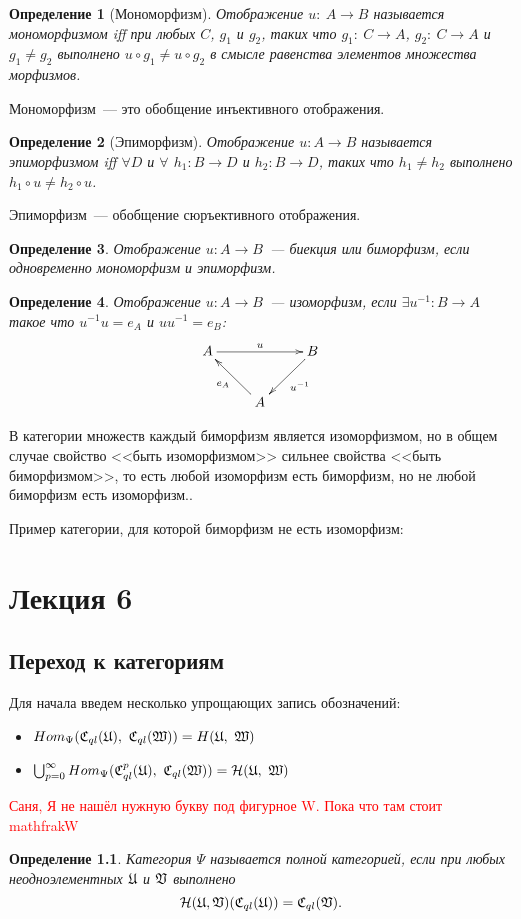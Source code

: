 \documentclass[a4paper, 12pt]{report}
\newtheorem{definition}{Определение}[chapter]
\begin{document}
\begin{definition}[Мономорфизм]
Отображение $u:\ A \rightarrow B$ называется мономорфизмом iff при любых $C$, $g_1$ и $g_2$, таких что $g_1:\ C \rightarrow A$, $g_2:\ C \rightarrow A$ и $g_1 \neq g_2$ выполнено $u \circ g_1 \neq u \circ g_2$ в смысле равенства элементов множества морфизмов.
\end{definition}

Мономорфизм~--- это обобщение инъективного отображения.
\begin{definition}[Эпиморфизм]
Отображение $u: A \rightarrow B$ называется эпиморфизмом iff $\forall D$ и $\forall$ $h_1: B \rightarrow D$ и $h_2: B \rightarrow D$, таких что $h_1 \neq h_2$ выполнено $h_1 \circ u \neq h_2 \circ u$.
\end{definition}

Эпиморфизм~--- обобщение сюръективного отображения.

\begin{definition}
Отображение $u: A \rightarrow B$~--- биекция или биморфизм, если одновременно мономорфизм и эпиморфизм.
\end{definition}

\begin{definition}
Отображение $u: A \rightarrow B$~--- изоморфизм, если $\exists u^{-1}: B \rightarrow A$ такое что $u^{-1} u = e_A$ и $u u^{-1} = e_B$:
\begin{equation*}
\xymatrix{
A\ar[rr]^u & & B\ar[ld]^{u^{-1}}\\
 & A\ar[lu]^{e_A} &
}
\end{equation*}
\end{definition}

В категории множеств каждый биморфизм является изоморфизмом, но в общем случае свойство <<быть изоморфизмом>> сильнее свойства <<быть биморфизмом>>, то есть любой изоморфизм есть биморфизм, но не любой биморфизм есть изоморфизм..

Пример категории, для которой биморфизм не есть изоморфизм:

\chapter{Лекция 6}
\section{Переход к категориям}
Для начала введем несколько упрощающих запись обозначений:
\begin{itemize}
  \item $Hom_{\Psi}(\Cql(\frakU),\ \Cql(\frakW)) = H(\frakU,\ \frakW)$
  \item $\bigcup_{p=0}^{\infty}Hom_{\Psi}(\Cql^p(\frakU),\ \Cql(\frakW)) = \calH(\frakU,\ \frakW)$
\end{itemize}
\textcolor{red}{Саня, Я не нашёл нужную букву под фигурное W. Пока что там стоит mathfrak{W}}
\begin{definition}
Категория $\Psi$ называется полной категорией, если при любых неодноэлементных $\mathfrak{U}$ и $\mathfrak{V}$ выполнено
\[
\mathcal{H}(\mathfrak{U}, \mathfrak{V})(\mathfrak{C}_{ql}(\mathfrak{U})) = \mathfrak{C}_{ql}(\mathfrak{V}).
\]
\end{definition}
\end{document}
